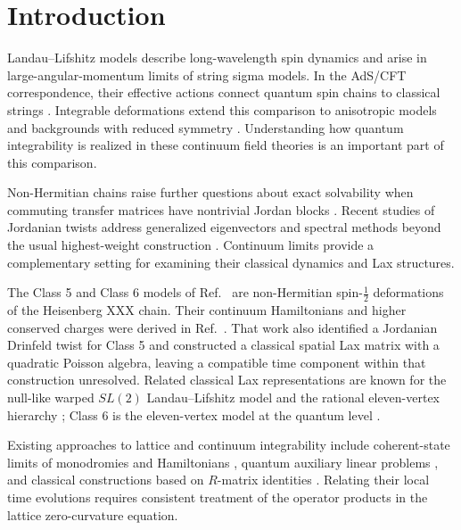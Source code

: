\section{Introduction}
\label{sec:introduction}

Landau--Lifshitz models describe long-wavelength spin dynamics and arise in
large-angular-momentum limits of string sigma models.  In the AdS/CFT
correspondence, their effective actions connect quantum spin chains to
classical strings \cite{Kruczenski2004,KruczenskiRyzhovTseytlin2004}.
Integrable deformations extend this comparison to anisotropic models and
backgrounds with reduced symmetry
\cite{KameyamaYoshida2014,DriezenLevkovichMaslyukMolines2026}.
Understanding how quantum integrability is realized in these continuum
field theories is an important part of this comparison.

Non-Hermitian chains raise further questions about exact solvability when
commuting transfer matrices have nontrivial Jordan blocks
\cite{deLeeuwPribytokRyan2019,CorcoranDeLeeuw2024}.  Recent studies of
Jordanian twists address generalized eigenvectors and spectral methods beyond
the usual highest-weight construction
\cite{DriezenLevkovichMaslyukMolines2026,BorsatoGarciaFernandez2025}.
Continuum limits provide a complementary setting for examining their
classical dynamics and Lax structures.

The Class 5 and Class 6 models of Ref.~\cite{deLeeuwPribytokRyan2019}
are non-Hermitian spin-$\tfrac12$ deformations of the Heisenberg XXX chain.
Their continuum Hamiltonians and higher conserved charges were derived in
Ref.~\cite{deLeeuwFontanellaNietoGarcia2026}.  That work also identified a
Jordanian Drinfeld twist for Class 5 and constructed a classical spatial Lax
matrix with a quadratic Poisson algebra, leaving a compatible time
component within that construction unresolved.  Related classical Lax representations are known for
the null-like warped $SL(2)$ Landau--Lifshitz model
\cite{KameyamaYoshida2014} and the rational eleven-vertex hierarchy
\cite{LevinOlshanetskyZotov2014,AtalikovZotov2021}; Class 6 is the
eleven-vertex model at the quantum level \cite{CorcoranDeLeeuw2024}.

Existing approaches to lattice and continuum integrability include
coherent-state limits of monodromies and Hamiltonians
\cite{AvanDoikouSfetsos2010,DoikouKaraiskos2011}, quantum auxiliary linear
problems \cite{DoikouFindlay2020}, and classical constructions based on
$R$-matrix identities \cite{DomanevskyZotov2025}.  Relating their local
time evolutions requires consistent treatment of the operator products in
the lattice zero-curvature equation.

